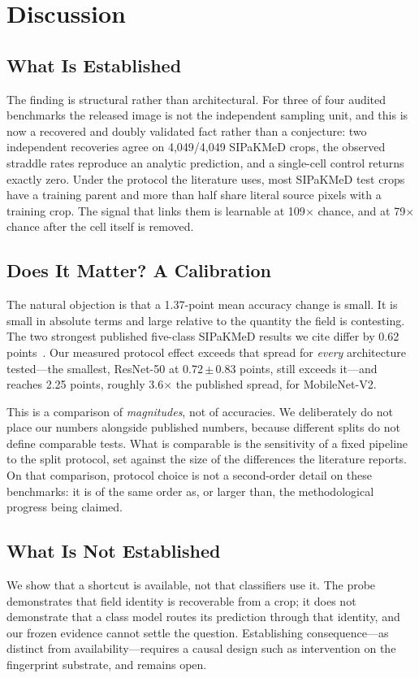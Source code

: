 \documentclass[conference]{IEEEtran}
\newcommand{\meanpm}[2]{#1\,$\pm$\,#2}
\begin{document}
\section{Discussion}
\subsection{What Is Established}
The finding is structural rather than architectural.
For three of four audited benchmarks the released image is not the independent sampling unit, and this is now a recovered and doubly validated fact rather than a conjecture: two independent recoveries agree on 4,049/4,049 SIPaKMeD crops, the observed straddle rates reproduce an analytic prediction, and a single-cell control returns exactly zero.
Under the protocol the literature uses, most SIPaKMeD test crops have a training parent and more than half share literal source pixels with a training crop.
The signal that links them is learnable at 109$\times$ chance, and at 79$\times$ chance after the cell itself is removed.

\subsection{Does It Matter? A Calibration}
The natural objection is that a 1.37-point mean accuracy change is small.
It is small in absolute terms and large relative to the quantity the field is contesting.
The two strongest published five-class SIPaKMeD results we cite differ by 0.62 points~\cite{rahaman2021deepcervix,gao2022knowledge}.
Our measured protocol effect exceeds that spread for \emph{every} architecture tested---the smallest, ResNet-50 at \meanpm{0.72}{0.83} points, still exceeds it---and reaches 2.25 points, roughly 3.6$\times$ the published spread, for MobileNet-V2.

This is a comparison of \emph{magnitudes}, not of accuracies.
We deliberately do not place our numbers alongside published numbers, because different splits do not define comparable tests.
What is comparable is the sensitivity of a fixed pipeline to the split protocol, set against the size of the differences the literature reports.
On that comparison, protocol choice is not a second-order detail on these benchmarks: it is of the same order as, or larger than, the methodological progress being claimed.

\subsection{What Is Not Established}
We show that a shortcut is available, not that classifiers use it.
The probe demonstrates that field identity is recoverable from a crop; it does not demonstrate that a class model routes its prediction through that identity, and our frozen evidence cannot settle the question.
Establishing consequence---as distinct from availability---requires a causal design such as intervention on the fingerprint substrate, and remains open.
\end{document}

